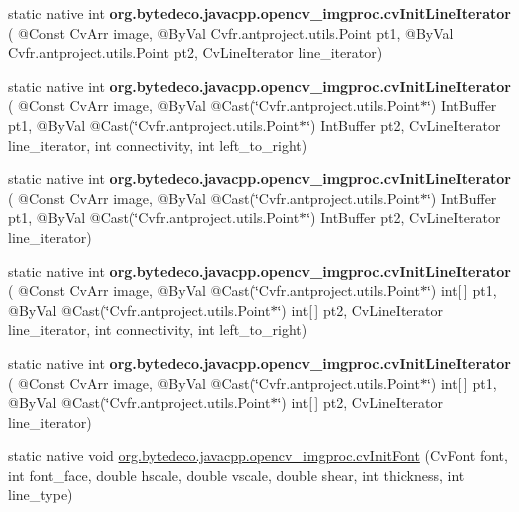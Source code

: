 \begin{DoxyCompactItemize}
static native int {\bfseries org.\+bytedeco.\+javacpp.\+opencv\+\_\+imgproc.\+cv\+Init\+Line\+Iterator} ( @Const Cv\+Arr image, @By\+Val Cv\+fr.antproject.utils.Point pt1, @By\+Val Cv\+fr.antproject.utils.Point pt2, Cv\+Line\+Iterator line\+\_\+iterator)
\item 
\mbox{\label{group__imgproc__c_gaf96639dddc5c8279e8834a9a41acecb8}} 
static native int {\bfseries org.\+bytedeco.\+javacpp.\+opencv\+\_\+imgproc.\+cv\+Init\+Line\+Iterator} ( @Const Cv\+Arr image, @By\+Val @Cast(\char`\"{}Cv\+fr.antproject.utils.Point$\ast$\char`\"{}) Int\+Buffer pt1, @By\+Val @Cast(\char`\"{}Cv\+fr.antproject.utils.Point$\ast$\char`\"{}) Int\+Buffer pt2, Cv\+Line\+Iterator line\+\_\+iterator, int connectivity, int left\+\_\+to\+\_\+right)
\item 
\mbox{\label{group__imgproc__c_ga050110d15454b41fbfbdba6b54a084c4}} 
static native int {\bfseries org.\+bytedeco.\+javacpp.\+opencv\+\_\+imgproc.\+cv\+Init\+Line\+Iterator} ( @Const Cv\+Arr image, @By\+Val @Cast(\char`\"{}Cv\+fr.antproject.utils.Point$\ast$\char`\"{}) Int\+Buffer pt1, @By\+Val @Cast(\char`\"{}Cv\+fr.antproject.utils.Point$\ast$\char`\"{}) Int\+Buffer pt2, Cv\+Line\+Iterator line\+\_\+iterator)
\item 
\mbox{\label{group__imgproc__c_gac4c7b1bbeb0ee95be85d6bc16db1f0df}} 
static native int {\bfseries org.\+bytedeco.\+javacpp.\+opencv\+\_\+imgproc.\+cv\+Init\+Line\+Iterator} ( @Const Cv\+Arr image, @By\+Val @Cast(\char`\"{}Cv\+fr.antproject.utils.Point$\ast$\char`\"{}) int\mbox{[}$\,$\mbox{]} pt1, @By\+Val @Cast(\char`\"{}Cv\+fr.antproject.utils.Point$\ast$\char`\"{}) int\mbox{[}$\,$\mbox{]} pt2, Cv\+Line\+Iterator line\+\_\+iterator, int connectivity, int left\+\_\+to\+\_\+right)
\item 
\mbox{\label{group__imgproc__c_ga5b47b353a2c9e9683be08c4d513d0f94}} 
static native int {\bfseries org.\+bytedeco.\+javacpp.\+opencv\+\_\+imgproc.\+cv\+Init\+Line\+Iterator} ( @Const Cv\+Arr image, @By\+Val @Cast(\char`\"{}Cv\+fr.antproject.utils.Point$\ast$\char`\"{}) int\mbox{[}$\,$\mbox{]} pt1, @By\+Val @Cast(\char`\"{}Cv\+fr.antproject.utils.Point$\ast$\char`\"{}) int\mbox{[}$\,$\mbox{]} pt2, Cv\+Line\+Iterator line\+\_\+iterator)
\item 
static native void \hyperlink{group__imgproc__c_ga7802f35f4ff9683ba622d633d5b17a25}{org.\+bytedeco.\+javacpp.\+opencv\+\_\+imgproc.\+cv\+Init\+Font} (Cv\+Font font, int font\+\_\+face, double hscale, double vscale, double shear, int thickness, int line\+\_\+type)

\end{DoxyCompactItemize}
